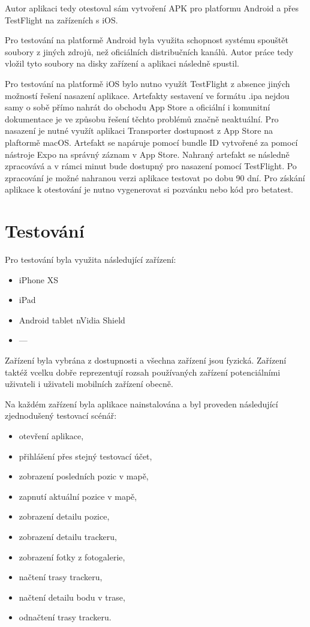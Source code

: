 Autor aplikaci tedy otestoval sám vytvoření APK pro platformu Android a přes TestFlight na zařízeních s iOS.

Pro testování na platformě Android byla využita schopnost systému spouštět soubory z jiných zdrojů, než oficiálních distribučních kanálů. Autor práce tedy vložil tyto soubory na disky zařízení a aplikaci následně spustil.

Pro testování na platformě iOS bylo nutno využít TestFlight z absence jiných možností řešení nasazení aplikace. Artefakty sestavení ve formátu .ipa nejdou samy o sobě přímo nahrát do obchodu App Store a oficiální i komunitní dokumentace je ve způsobu řešení těchto problémů značně neaktuální. Pro nasazení je nutné využít aplikaci Transporter dostupnost z App Store na plaftormě macOS. Artefakt se napáruje pomocí bundle ID vytvořené za pomocí nástroje Expo na správný záznam v App Store. Nahraný artefakt se následně zpracovává a v rámci minut bude dostupný pro nasazení pomocí TestFlight. Po zpracování je možné nahranou verzi aplikace testovat po dobu 90 dní. Pro získání aplikace k otestování je nutno vygenerovat si pozvánku nebo kód pro betatest.

\section{Testování}
Pro testování byla využita následující zařízení:
\begin{itemize}
	\item iPhone XS
	\item iPad
	\item Android tablet nVidia Shield
	\item ---
\end{itemize}

Zařízení byla vybrána z dostupnosti a všechna zařízení jsou fyzická. Zařízení taktéž vcelku dobře reprezentují rozsah používaných zařízení potenciálními uživateli i uživateli mobilních zařízení obecně.

Na každém zařízení byla aplikace nainstalována a byl proveden následující zjednodušený testovací scénář:

\begin{itemize}
	\item otevření aplikace,
	\item přihlášení přes stejný testovací účet,
	\item zobrazení posledních pozic v mapě,
	\item zapnutí aktuální pozice v mapě,
	\item zobrazení detailu pozice,
	\item zobrazení detailu trackeru,
	\item zobrazení fotky z fotogalerie,
	\item načtení trasy trackeru,
	\item načtení detailu bodu v trase,
	\item odnačtení trasy trackeru.
\end{itemize}

